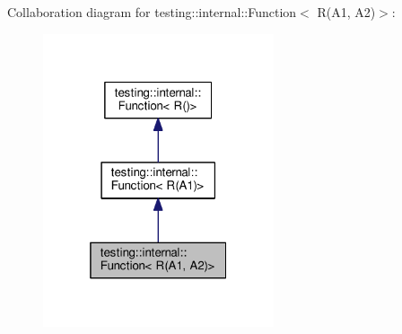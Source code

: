 Collaboration diagram for testing\+:\+:internal\+:\+:Function$<$ R(A1, A2)$>$\+:\nopagebreak
\begin{figure}[H]
\begin{center}
\leavevmode
\includegraphics[width=193pt]{structtesting_1_1internal_1_1Function_3_01R_07A1_00_01A2_08_4__coll__graph}
\end{center}
\end{figure}
